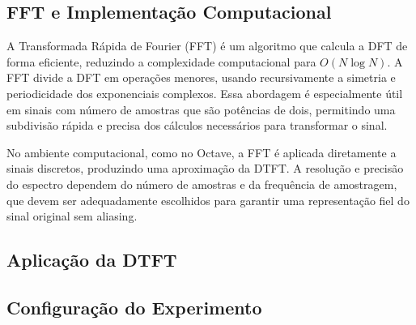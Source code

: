 \subsection{FFT e Implementação Computacional}

A Transformada Rápida de Fourier (FFT) é um algoritmo que calcula a DFT de forma eficiente, reduzindo a complexidade computacional para $O(N \log N)$. A FFT divide a DFT em operações menores, usando recursivamente a simetria e periodicidade dos exponenciais complexos. Essa abordagem é especialmente útil em sinais com número de amostras que são potências de dois, permitindo uma subdivisão rápida e precisa dos cálculos necessários para transformar o sinal.

No ambiente computacional, como no Octave, a FFT é aplicada diretamente a sinais discretos, produzindo uma aproximação da DTFT. A resolução e precisão do espectro dependem do número de amostras e da frequência de amostragem, que devem ser adequadamente escolhidos para garantir uma representação fiel do sinal original sem aliasing.


\subsection{Aplicação da DTFT}


\subsection{Configuração do Experimento}



